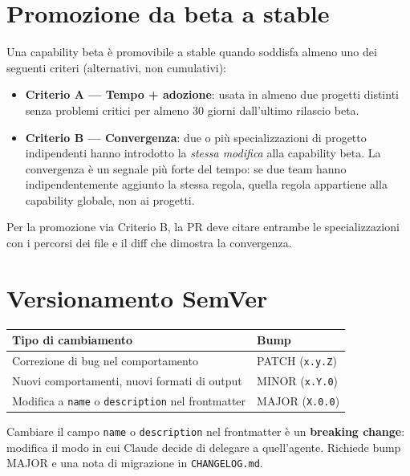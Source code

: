 \documentclass[12pt,a4paper,twoside]{book}
\begin{document}
\section{Promozione da beta a stable}

Una capability beta è promovibile a stable quando soddisfa almeno uno dei seguenti criteri (alternativi, non cumulativi):

\begin{itemize}
  \item \textbf{Criterio A — Tempo + adozione}: usata in almeno due progetti distinti senza problemi critici per almeno 30 giorni dall'ultimo rilascio beta.
  \item \textbf{Criterio B — Convergenza}: due o più specializzazioni di progetto indipendenti hanno introdotto la \textit{stessa modifica} alla capability beta. La convergenza è un segnale più forte del tempo: se due team hanno indipendentemente aggiunto la stessa regola, quella regola appartiene alla capability globale, non ai progetti.
\end{itemize}

Per la promozione via Criterio B, la PR deve citare entrambe le specializzazioni con i percorsi dei file e il diff che dimostra la convergenza.

\section{Versionamento SemVer}

\begin{center}
\begin{tabular}{ll}
\toprule
\textbf{Tipo di cambiamento} & \textbf{Bump} \\
\midrule
Correzione di bug nel comportamento & PATCH (\texttt{x.y.Z}) \\
Nuovi comportamenti, nuovi formati di output & MINOR (\texttt{x.Y.0}) \\
Modifica a \texttt{name} o \texttt{description} nel frontmatter & MAJOR (\texttt{X.0.0}) \\
\bottomrule
\end{tabular}
\end{center}

\begin{attenzione}
Cambiare il campo \texttt{name} o \texttt{description} nel frontmatter è un \textbf{breaking change}: modifica il modo in cui Claude decide di delegare a quell'agente. Richiede bump MAJOR e una nota di migrazione in \texttt{CHANGELOG.md}.
\end{attenzione}
\end{document}
